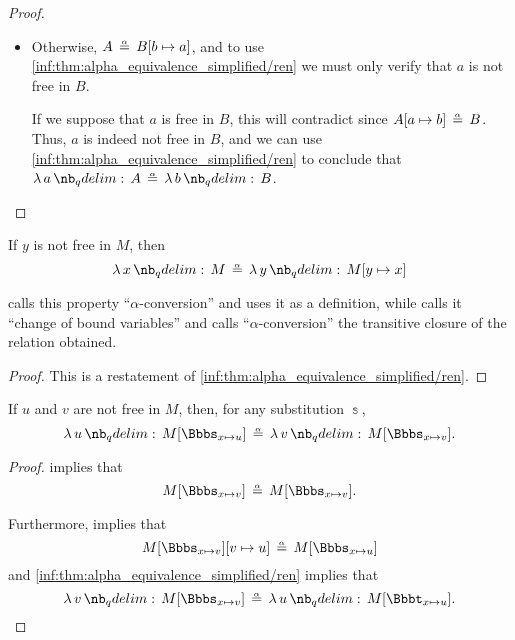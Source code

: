 \begin{proof}
\begin{itemize}
    \item Otherwise, \( A \aequiv B[b \mapsto a] \), and to use \ref{inf:thm:alpha_equivalence_simplified/ren} we must only verify that \( a \) is not free in \( B \).

    If we suppose that \( a \) is free in \( B \), this will contradict  since \( A[a \mapsto b] \aequiv B \). Thus, \( a \) is indeed not free in \( B \), and we can use \ref{inf:thm:alpha_equivalence_simplified/ren} to conclude that \( \qabs a A \aequiv \qabs b B \).
  \end{itemize}
\end{proof}

\begin{corollary}\label{thm:alpha_conversion}
  If \( y \) is not free in \( M \), then
  \begin{equation}\label{eq:thm:alpha_conversion}
    \qabs x M \aequiv \qabs y M[y \mapsto x]
  \end{equation}
\end{corollary}
\begin{comments}
  \item {} calls this property \enquote{\( \alpha \)-conversion} and uses it as a definition, while  calls it \enquote{change of bound variables} and calls \enquote{\( \alpha \)-conversion} the transitive closure of the relation obtained.
\end{comments}
\begin{proof}
  This is a restatement of \ref{inf:thm:alpha_equivalence_simplified/ren}.
\end{proof}

\begin{corollary}\label{thm:alpha_conversion_modified}
  If \( u \) and \( v \) are not free in \( M \), then, for any substitution \( \Bbbs \),
  \begin{equation}\label{eq:thm:alpha_conversion_modified}
    \qabs u M[\Bbbs_{x \mapsto u}] \aequiv \qabs v M[\Bbbs_{x \mapsto v}].
  \end{equation}
\end{corollary}
\begin{proof}
   implies that
  \begin{equation*}
    M[\Bbbs_{x \mapsto v}] \aequiv M[\Bbbs_{x \mapsto v}].
  \end{equation*}

  Furthermore,  implies that
  \begin{equation*}
    M[\Bbbs_{x \mapsto v}][v \mapsto u] \aequiv M[\Bbbs_{x \mapsto u}]
  \end{equation*}
  and \ref{inf:thm:alpha_equivalence_simplified/ren} implies that
  \begin{equation*}
    \qabs v M[\Bbbs_{x \mapsto v}] \aequiv \qabs u M[\Bbbt_{x \mapsto u}].
  \end{equation*}
\end{proof}

